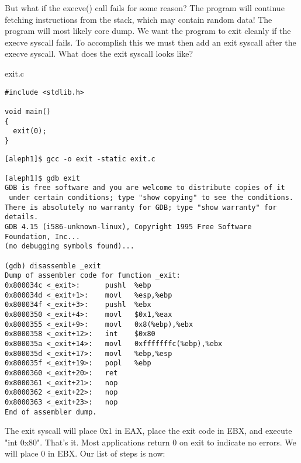 \documentclass[10pt]{article}
\begin{document}
But what if the execve() call fails for some reason? The program will continue fetching instructions from the 
stack, which may contain random data! The program will most likely core dump. We want the program to exit 
cleanly if the execve syscall fails. To accomplish this we must then add an exit syscall after the execve syscall. 
What does  the exit syscall looks like?

exit.c

\begin{lstlisting}
#include <stdlib.h>

void main() 
{
  exit(0);
}
\end{lstlisting}

\begin{verbatim}
[aleph1]$ gcc -o exit -static exit.c

[aleph1]$ gdb exit
GDB is free software and you are welcome to distribute copies of it
 under certain conditions; type "show copying" to see the conditions.
There is absolutely no warranty for GDB; type "show warranty" for details.
GDB 4.15 (i586-unknown-linux), Copyright 1995 Free Software Foundation, Inc...
(no debugging symbols found)...

(gdb) disassemble _exit
Dump of assembler code for function _exit:
0x800034c <_exit>:      pushl  %ebp
0x800034d <_exit+1>:    movl   %esp,%ebp
0x800034f <_exit+3>:    pushl  %ebx
0x8000350 <_exit+4>:    movl   $0x1,%eax
0x8000355 <_exit+9>:    movl   0x8(%ebp),%ebx
0x8000358 <_exit+12>:   int    $0x80
0x800035a <_exit+14>:   movl   0xfffffffc(%ebp),%ebx
0x800035d <_exit+17>:   movl   %ebp,%esp
0x800035f <_exit+19>:   popl   %ebp
0x8000360 <_exit+20>:   ret
0x8000361 <_exit+21>:   nop
0x8000362 <_exit+22>:   nop
0x8000363 <_exit+23>:   nop
End of assembler dump.
\end{verbatim}

The exit syscall will place 0x1 in EAX, place the exit code in EBX, and execute "int 0x80". That's it. Most 
applications return 0 on exit to indicate no errors. We will place 0 in EBX.  Our list of steps is now: 
\end{document}
